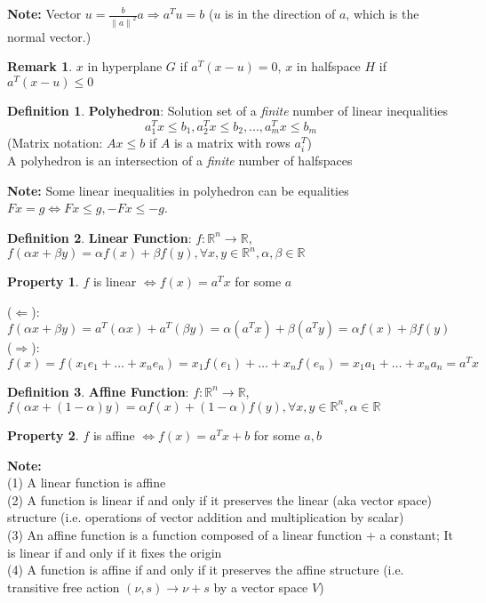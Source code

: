\documentclass[10pt]{article}
\def\R{\mathbb{R}}
\def\a{\alpha}
\def\b{\beta}
\def\imp{\Rightarrow}
\def\limp{\Leftarrow}
\def\goes{\rightarrow}
\theoremstyle{definition}
\newtheorem{defn}{Definition}[section]
\newtheorem{pty}{Property}[section]
\newtheorem{remark}{Remark}[section]
\newcommand{\Note}[0]{\noindent\textbf{Note: }}
\newcommand{\norm}[1]{\left\lVert#1\right\rVert} %
\begin{document}
\Note Vector \(u = \frac{b}{\norm{a}^2}a \imp a^Tu = b\) ($u$ is in the direction of $a$, which is the normal vector.)

\begin{remark}
	$x$ in hyperplane $G$ if $a^T(x-u) = 0$, $x$ in halfspace $H$ if $a^T(x-u) \le 0$
\end{remark}

\begin{defn}
	\textbf{Polyhedron}: Solution set of a \textit{finite} number of linear inequalities
	$$a^{T}_1x \le b_1, a^{T}_2x\le b_2, . . . , a^{T}_mx\le b_m$$
	(Matrix notation: $Ax\le b$ if $A$ is a matrix with rows $a^{T}_i$)\\
	A polyhedron is an intersection of a \textit{finite} number of halfspaces
\end{defn}
\Note Some linear inequalities in polyhedron can be equalities $Fx = g \iff Fx \le g, -Fx \le -g$.

\begin{defn}
	\textbf{Linear Function}: $f: \R^n \goes \R$, $f(\a x + \b y) = \a f(x) + \b f(y), \forall x, y \in \R^n, \a, \b \in \R$
\end{defn}

\begin{pty}
	$f$ is linear $\iff f(x) = a^Tx$ for some $a$
\end{pty}
\proof
($\limp$): $f(\a x + \b y) = a^T(\a x) + a^T(\b y) = \a(a^Tx) + \b(a^Ty) = \a f(x) + \b f(y)$\\
($\imp$): $f(x) = f(x_{1}e_{1}+ \dots + x_{n}e_{n}) = x_{1}f(e_{1}) + \dots + x_{n}f(e_{n}) = x_{1}a_{1} + \dots + x_{n}a_{n} = a^Tx$
\qedhere

\begin{defn}
	\textbf{Affine Function}: $f: \R^n \goes \R$, $f(\a x + (1-\a) y) = \a f(x) + (1-\a) f(y), \forall x, y \in \R^n, \a \in \R$
\end{defn}

\begin{pty}
	$f$ is affine $\iff f(x) = a^Tx + b$ for some $a, b$
\end{pty}
\proof
\qedhere

\Note\\
(1) A linear function is affine\\
(2) A function is linear if and only if it preserves the linear (aka vector space) structure (i.e. operations of vector addition and multiplication by scalar)\\
(3) An affine function is a function composed of a linear function + a constant; It is linear if and only if it fixes the origin\\
(4) A function is affine if and only if it preserves the affine structure (i.e. transitive free action $(\nu,s) \goes \nu + s$ by a vector space $V$)
\end{document}
